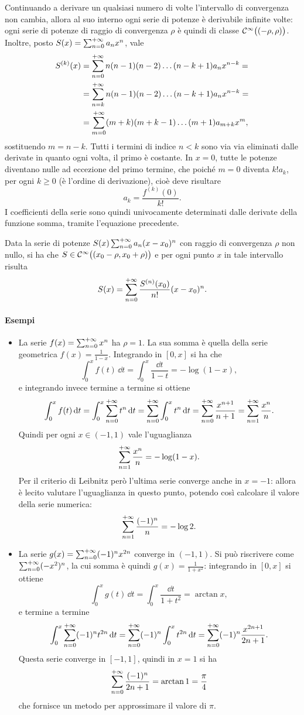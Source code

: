Continuando a derivare un qualsiasi numero di volte l'intervallo di convergenza non cambia, allora al suo interno ogni serie di potenze è derivabile infinite volte: ogni serie di potenze di raggio di convergenza $\rho$ è quindi di classe $\mathcal{C}^{{\infty}}\big((-\rho,\rho)\big)$. Inoltre, posto $S(x)=\sum_{{n}=0}^{+\infty}a_nx^n$, vale
\[\begin{split}
S^{(k)}(x)	&=\sum_{{n}=0}^{+\infty}n(n-1)(n-2)\dots(n-k+1)a_nx^{n-k}=\\
			&=\sum_{n=k}^{+\infty}n(n-1)(n-2)\dots(n-k+1)a_nx^{n-k}=\\
			&=\sum_{{m}=0}^{+\infty}(m+k)(m+k-1)\dots(m+1)a_{m+k}x^m,
\end{split}\]
sostituendo $m=n-k$. Tutti i termini di indice $n<k$ sono via via eliminati dalle derivate in quanto ogni volta, il primo è costante.
In $x=0$, tutte le potenze diventano nulle ad eccezione del primo termine, che poiché $m=0$ diventa $k!a_k$, per ogni $k\geq 0$ (è l'ordine di derivazione), cioè deve risultare
\[
a_k=\frac{f^{(k)}(0)}{k!}.
\]
I coefficienti della serie sono quindi univocamente determinati dalle derivate della funzione somma, tramite l'equazione precedente.
\begin{teorema}
Data la serie di potenze $S(x)\sum_{{n}=0}^{+\infty}a_n(x-x_0)^n$ con raggio di convergenza $\rho$ non nullo, si ha che $S\in\mathcal{C}^{{\infty}}\big((x_0-\rho,x_0+\rho)\big)$ e per ogni punto $x$ in tale intervallo risulta
\begin{equation} \label{eq:serie_potenze_taylor}
S(x)=\sum_{{n}=0}^{+\infty}\frac{S^{(n)}(x_0)}{n!}(x-x_0)^n.
\end{equation}
\end{teorema}
\paragraph{Esempi}
\begin{itemize}
\item La serie $f(x)=\sum_{{n}=0}^{+\infty}x^n$ ha $\rho=1$. La sua somma è quella della serie geometrica $f(x)=\frac1{1-x}$. Integrando in $[0,x]$ si ha che
\[
\int_0^xf(t)\,\dd t=\int_0^x\frac{\dd t}{1-t}=-\log(1-x),
\]
e integrando invece termine a termine si ottiene
\[
\int_0^xf(t)\,\textup{d} t=\int_0^x\sum_{{n}=0}^{+\infty}t^n\,\textup{d} t=\sum_{{n}=0}^{+\infty}\int_0^xt^n\,\textup{d} t=\sum_{{n}=0}^{+\infty}\frac{x^{n+1}}{n+1}=\sum_{{n}=1}^{+\infty}\frac{x^n}{n}.
\]
Quindi per ogni $x\in(-1,1)$ vale l'uguaglianza
\[
\sum_{{n}=1}^{+\infty}\frac{x^n}{n}=-\log(1-x).
\]
Per il criterio di Leibnitz però l'ultima serie converge anche in $x=-1$: allora è lecito valutare l'uguaglianza in questo punto, potendo così calcolare il valore della serie numerica:
\[
\sum_{{n}=1}^{+\infty}\frac{(-1)^n}{n}=-\log 2.
\]
\item La serie $g(x)=\sum_{{n}=0}^{+\infty}(-1)^nx^{2n}$ converge in $(-1,1)$. Si può riscrivere come $\sum_{{n}=0}^{+\infty}(-x^2)^n$, la cui somma è quindi $g(x)=\frac1{1+x^2}$: integrando in $[0,x]$ si ottiene
\[
\int_0^xg(t)\,\dd t=\int_0^x\frac{\dd t}{1+t^2}=\arctan x,
\]
e termine a termine
\[
\int_0^x\sum_{{n}=0}^{+\infty}(-1)^nt^{2n}\,\textup{d} t=\sum_{{n}=0}^{+\infty}(-1)^n\int_0^xt^{2n}\,\textup{d} t=\sum_{{n}=0}^{+\infty}(-1)^n\frac{x^{2n+1}}{2n+1}.
\]
Questa serie converge in $[-1,1]$, quindi in $x=1$ si ha
\[
\sum_{{n}=0}^{+\infty}\frac{(-1)^n}{2n+1}=\arctan 1=\frac{\pi}4
\]
che fornisce un metodo per approssimare il valore di $\pi$.
\end{itemize}

